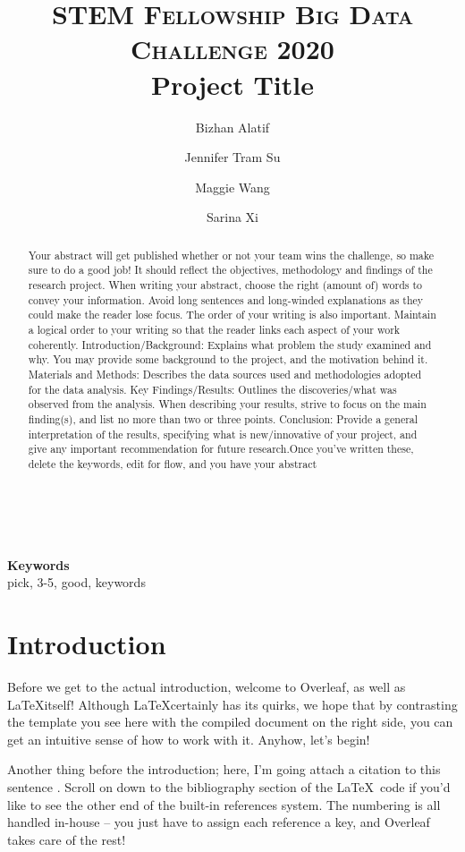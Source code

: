 \documentclass[10pt,twocolumn,letterpaper]{article}
\title{
		\usefont{OT1}{bch}{b}{n}
		\normalfont \normalsize \textsc{STEM Fellowship Big Data Challenge 2020} \\ [10pt]
		\huge Project Title \\
}
\author[1]{Bizhan Alatif}
\author[1]{Jennifer Tram Su}
\author[1]{Maggie Wang}
\author[2]{Sarina Xi}
\affil[1]{McGill University}
\affil[2]{University of Toronto}
\begin{document}
\maketitle

\begin{abstract}
Your abstract will get published whether or not your team wins the challenge, so make sure to do a good job! It should reflect the objectives, methodology and findings of the research project. When writing your abstract, choose the right (amount of) words to convey your information. Avoid long sentences and long-winded explanations as they could make the reader lose focus. The order of your writing is also important. Maintain a logical order to your writing so that the reader links each aspect of your work coherently. Introduction/Background: Explains what problem the study examined and why. You may provide some background to the project, and the motivation behind it. Materials and Methods: Describes the data sources used and methodologies adopted for the data analysis. Key Findings/Results: Outlines the discoveries/what was observed from the analysis. When describing your results, strive to focus on the main finding(s), and list no more than two or three points. Conclusion: Provide a general interpretation of the results, specifying what is new/innovative of your project, and give any important recommendation for future research.Once you've written these, delete the keywords, edit for flow, and you have your abstract
\end{abstract} \\ 
\\ 
{\textbf{Keywords} \\
pick, 3-5, good, keywords}

\section{Introduction}
Before we get to the actual introduction, welcome to Overleaf, as well as \LaTeX itself! Although \LaTeX certainly has its quirks, we hope that by contrasting the template you see here with the compiled document on the right side, you can get an intuitive sense of how to work with it. Anyhow, let's begin!

Another thing before the introduction; here, I'm going attach a citation to this sentence \cite{ReferenceName}. Scroll on down to the bibliography section of the \LaTeX\ code if you'd like to see the other end of the built-in references system. The numbering is all handled in-house -- you just have to assign each reference a key, and Overleaf takes care of the rest!
\end{document}
